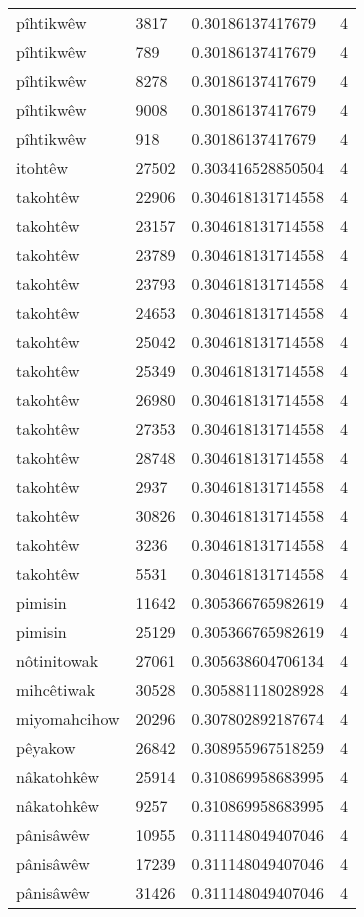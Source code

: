 \begin{longtable}{llll}
pîhtikwêw & 3817 & 0.30186137417679 & 4 \\
pîhtikwêw & 789 & 0.30186137417679 & 4 \\
pîhtikwêw & 8278 & 0.30186137417679 & 4 \\
pîhtikwêw & 9008 & 0.30186137417679 & 4 \\
pîhtikwêw & 918 & 0.30186137417679 & 4 \\
itohtêw & 27502 & 0.303416528850504 & 4 \\
takohtêw & 22906 & 0.304618131714558 & 4 \\
takohtêw & 23157 & 0.304618131714558 & 4 \\
takohtêw & 23789 & 0.304618131714558 & 4 \\
takohtêw & 23793 & 0.304618131714558 & 4 \\
takohtêw & 24653 & 0.304618131714558 & 4 \\
takohtêw & 25042 & 0.304618131714558 & 4 \\
takohtêw & 25349 & 0.304618131714558 & 4 \\
takohtêw & 26980 & 0.304618131714558 & 4 \\
takohtêw & 27353 & 0.304618131714558 & 4 \\
takohtêw & 28748 & 0.304618131714558 & 4 \\
takohtêw & 2937 & 0.304618131714558 & 4 \\
takohtêw & 30826 & 0.304618131714558 & 4 \\
takohtêw & 3236 & 0.304618131714558 & 4 \\
takohtêw & 5531 & 0.304618131714558 & 4 \\
pimisin & 11642 & 0.305366765982619 & 4 \\
pimisin & 25129 & 0.305366765982619 & 4 \\
nôtinitowak & 27061 & 0.305638604706134 & 4 \\
mihcêtiwak & 30528 & 0.305881118028928 & 4 \\
miyomahcihow & 20296 & 0.307802892187674 & 4 \\
pêyakow & 26842 & 0.308955967518259 & 4 \\
nâkatohkêw & 25914 & 0.310869958683995 & 4 \\
nâkatohkêw & 9257 & 0.310869958683995 & 4 \\
pânisâwêw & 10955 & 0.311148049407046 & 4 \\
pânisâwêw & 17239 & 0.311148049407046 & 4 \\
pânisâwêw & 31426 & 0.311148049407046 & 4 \\

\end{longtable}
